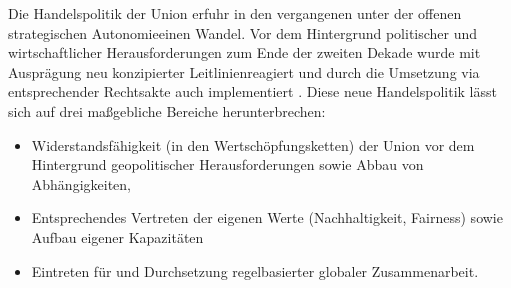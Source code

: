 \documentclass[12pt,a4paper,oneside]{book} %
\begin{document}
Die Handelspolitik der Union erfuhr in den vergangenen unter der \glqq offenen strategischen Autonomie\grqq einen Wandel. Vor dem Hintergrund politischer und wirtschaftlicher Herausforderungen zum Ende der zweiten Dekade wurde mit Ausprägung neu konzipierter \glqq Leitlinien\grqq reagiert und durch die Umsetzung via entsprechender Rechtsakte auch implementiert \autocite{RdTW 2024, 217}. Diese neue Handelspolitik lässt sich auf drei maßgebliche Bereiche herunterbrechen:

\begin{itemize}
	\item Widerstandsfähigkeit (in den Wertschöpfungsketten) der Union vor dem Hintergrund geopolitischer Herausforderungen sowie Abbau von Abhängigkeiten,
	\item Entsprechendes Vertreten der eigenen Werte (Nachhaltigkeit, Fairness) sowie Aufbau eigener Kapazitäten
	\item Eintreten für und Durchsetzung regelbasierter globaler Zusammenarbeit.\autocites{ZRP 2023, 207}{DGAP Policy Brief 8/2021}{COM 2021 66, S. 4f.}
\end{itemize}
\end{document}
